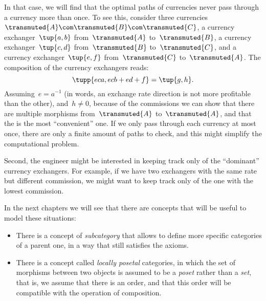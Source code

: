In that case, we will find that the optimal paths of currencies never pass through a currency more than once.
To see this, consider three currencies~$\transmuted{A}\com\transmuted{B}\com\transmuted{C}$, a currency exchanger~$\tup{a,b}$ from~$\transmuted{A}$ to~$\transmuted{B}$, a currency exchanger~$\tup{c,d}$ from~$\transmuted{B}$ to~$\transmuted{C}$, and a currency exchanger~$\tup{e,f}$ from~$\transmuted{C}$ to~$\transmuted{A}$.
The composition of the currency exchangers reads:
\begin{equation}
    \tupp{eca, ecb+ed+f}=\tup{g,h}.
\end{equation}
Assuming~$e=a^{-1}$ (in words, an exchange rate direction is not more profitable than the other), and~$h\neq 0$, because of the commissions we can show that there are multiple morphisms from~$\transmuted{A}$ to~$\transmuted{A}$, and that the  is the most ``convenient'' one.
If we only pass through each currency at most once, there are only a finite amount of paths to check, and this might simplify the computational problem.

Second, the engineer might be interested in keeping track only of the ``dominant'' currency exchangers.
For example, if we have two exchangers with the same rate but different commission, we might want to keep track only of the one with the lowest commission.

In the next chapters we will see that there are concepts that will be useful to model these situations:
\begin{itemize}
    \item There is a concept of \emph{subcategory} that allows to define more specific categories of a parent one, in a way that still satisfies the axioms.
    \item There is a concept called \emph{locally posetal} categories, in which the set of morphisms between two objects is assumed to be a \emph{poset} rather than a \emph{set}, that is, we assume that there is an order, and that this order will be compatible with the operation of composition.
\end{itemize}
